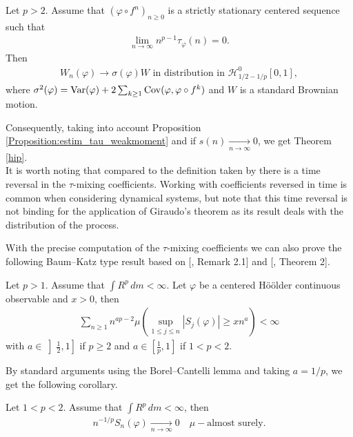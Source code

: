 \documentclass{ws-sd}
\newcommand{\abs}[1]{\left\lvert #1 \right\rvert}
\newcommand\bigp[1]{\left(#1\right)}
\begin{document}
\begin{theorem}
        \label{Theorem_gir}
    Let $p > 2$. Assume that $(\varphi \circ f^n)_{n \ge 0}$ is a strictly stationary centered sequence such that
        \begin{align}\label{cond_Gir_tau}
            \lim\limits_{n \to \infty} n^{p-1}\tau_\varphi(n) = 0.
        \end{align}
    Then
        \begin{align*}
            W_n(\varphi) \to \sigma(\varphi)W \text{ in distribution in } \mathcal H _{1/2-1/p}^0 [0,1],
        \end{align*}
    where
    $\sigma^2(\varphi) = {\rm  Var}(\varphi) + 2\sum_{k \ge 1} {\rm Cov}(\varphi, \varphi \circ f^k)$ and $W$ is a standard Brownian motion.
\end{theorem}
\noindent
Consequently, taking into account Proposition \ref{Proposition:estim_tau_weakmoment} and if $s(n) \xrightarrow[n \to \infty]{} 0$, we get Theorem \ref{hip}.
\\

It is worth noting that compared to the definition taken by \cite{12} there is a time reversal in the $\tau$-mixing coefficients. Working with coefficients reversed in time is common when considering dynamical systems, but note that this time reversal is not binding for the application of Giraudo's theorem as its result deals with the distribution of the process.


With the precise computation of the $\tau$-mixing coefficients we can also prove the following Baum--Katz type result based on [, Remark 2.1] and [, Theorem 2].
\begin{theorem}\label{BaumKatz}
    Let $p > 1$. Assume that $\int R^p \, dm < \infty$. Let $\varphi$ be a centered H\"oölder continuous observable and $x > 0$, then
    \begin{align*}
         \sum_{n \ge 1} n ^{a p -2} \mu \bigp{\sup_{1 \le j \le n} \abs{S_j(\varphi)} \ge xn^a} < \infty
    \end{align*}
    with
     $a \in \left] \frac 1 2 , 1\right]$ if $p \ge 2$
     and
     $a \in \left[ \frac 1 p , 1\right]$ if $1 < p < 2$.
\end{theorem}

By standard arguments using the Borel--Cantelli lemma and taking $a = 1/p$, we get the following corollary.

\begin{corollary}
    Let $1 < p < 2$. Assume that $\int R^p \, dm < \infty$, then
    \begin{align*}
        n^{-1/p}S_n(\varphi) \xrightarrow[n \to \infty]{} 0 \quad \mu-\text{almost surely}.
    \end{align*}
\end{corollary}
\end{document}
